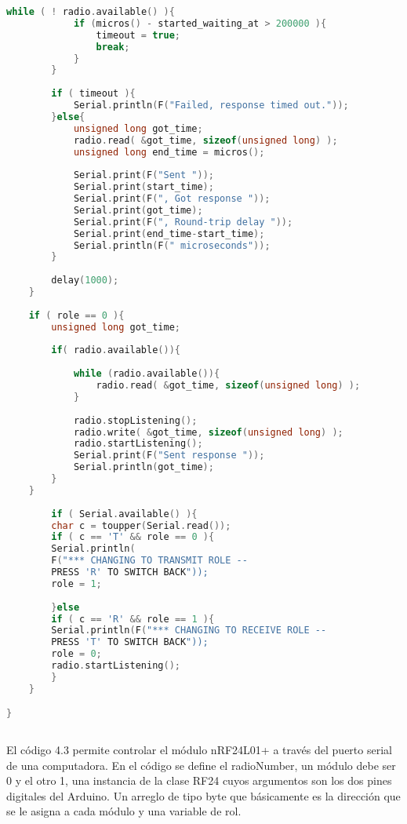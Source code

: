 \begin{lstlisting}[language=C++, caption={Codigo Ejemplo para módulo nRF24L01+}, captionpos=b]
		while ( ! radio.available() ){                            
			if (micros() - started_waiting_at > 200000 ){           
				timeout = true;
				break;
			}
		}
		
		if ( timeout ){                                           
			Serial.println(F("Failed, response timed out."));
		}else{
			unsigned long got_time;                               
			radio.read( &got_time, sizeof(unsigned long) );
			unsigned long end_time = micros();
			
			Serial.print(F("Sent "));
			Serial.print(start_time);
			Serial.print(F(", Got response "));
			Serial.print(got_time);
			Serial.print(F(", Round-trip delay "));
			Serial.print(end_time-start_time);
			Serial.println(F(" microseconds"));
		}
		
		delay(1000);
	}
	
	if ( role == 0 ){
		unsigned long got_time;
		
		if( radio.available()){
		
			while (radio.available()){                                  
				radio.read( &got_time, sizeof(unsigned long) );            
			}
			
			radio.stopListening();                                       
			radio.write( &got_time, sizeof(unsigned long) );             
			radio.startListening();                                      
			Serial.print(F("Sent response "));
			Serial.println(got_time);
		}
	}
		
		if ( Serial.available() ){
		char c = toupper(Serial.read());
		if ( c == 'T' && role == 0 ){
		Serial.println(
		F("*** CHANGING TO TRANSMIT ROLE -- 
		PRESS 'R' TO SWITCH BACK"));
		role = 1;                 
		
		}else
		if ( c == 'R' && role == 1 ){
		Serial.println(F("*** CHANGING TO RECEIVE ROLE -- 
		PRESS 'T' TO SWITCH BACK"));
		role = 0;                
		radio.startListening();
		}
	}

} 
	
\end{lstlisting}

\par \noindent
El código 4.3 permite controlar el módulo nRF24L01+ a través del puerto serial de una computadora. En el código se define el radioNumber, un módulo debe ser 0 y el otro 1, una instancia de la clase RF24 cuyos argumentos son los dos pines digitales del Arduino. Un arreglo de tipo byte que básicamente es la dirección que se le asigna a cada módulo y una variable de rol. 

